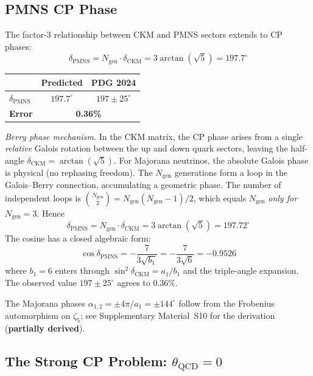\documentclass[12pt,a4paper]{article}
\theoremstyle{definition}
\begin{document}
\subsection{PMNS CP Phase}

The factor-3 relationship between CKM and PMNS sectors extends to CP phases:
\begin{equation}
\boxed{\delta_{\text{PMNS}} = N_{\text{gen}} \cdot \delta_{\text{CKM}} = 3\arctan(\sqrt{5}) = 197.7^\circ}
\end{equation}
\begin{center}
\begin{tabular}{lcc}
\toprule
& \textbf{Predicted} & \textbf{PDG 2024} \\
\midrule
$\delta_{\text{PMNS}}$ & $197.7^\circ$ & $197 \pm 25^\circ$ \\
\textbf{Error} & \multicolumn{2}{c}{\textbf{0.36\%}} \\
\bottomrule
\end{tabular}
\end{center}

\noindent\textit{Berry phase mechanism.}  In the CKM matrix, the CP phase arises from a single \emph{relative} Galois rotation between the up and down quark sectors, leaving the half-angle $\delta_{\text{CKM}} = \arctan(\sqrt{5})$.  For Majorana neutrinos, the absolute Galois phase is physical (no rephasing freedom).  The $N_{\text{gen}}$ generations form a loop in the Galois--Berry connection, accumulating a geometric phase.  The number of independent loops is $\binom{N_{\text{gen}}}{2} = N_{\text{gen}}(N_{\text{gen}}-1)/2$, which equals $N_{\text{gen}}$ \emph{only for} $N_{\text{gen}} = 3$.  Hence
\begin{equation}
\delta_{\text{PMNS}} = N_{\text{gen}} \cdot \delta_{\text{CKM}} = 3\arctan(\sqrt{5}) = 197.72^\circ
\end{equation}
The cosine has a closed algebraic form:
\begin{equation}
\cos\delta_{\text{PMNS}} = -\frac{7}{3\sqrt{b_1}} = -\frac{7}{3\sqrt{6}} = -0.9526
\end{equation}
where $b_1 = 6$ enters through $\sin^2\delta_{\text{CKM}} = a_1/b_1$ and the triple-angle expansion.  The observed value $197 \pm 25^\circ$ agrees to 0.36\%.

The Majorana phases $\alpha_{1,2} = \pm 4\pi/a_1 = \pm 144^\circ$ follow from the Frobenius automorphism on $\zeta_5$; see Supplementary Material~S10 for the derivation (\textbf{partially derived}).

\subsection{The Strong CP Problem: \texorpdfstring{$\theta_{\text{QCD}} = 0$}{theta\_QCD = 0}}
\end{document}

